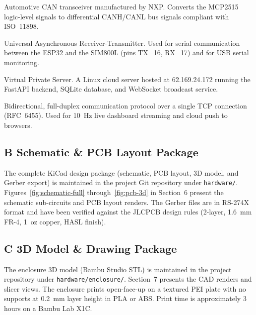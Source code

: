 \begin{description}[leftmargin=3.2cm, style=nextline, font=\bfseries]
  \item[TJA1051T]   Automotive CAN transceiver manufactured by NXP. Converts the MCP2515 logic-level signals to differential CANH/CANL bus signals compliant with ISO~11898.
  \item[UART]       Universal Asynchronous Receiver-Transmitter. Used for serial communication between the ESP32 and the SIM800L (pins TX=16, RX=17) and for USB serial monitoring.
  \item[VPS]        Virtual Private Server. A Linux cloud server hosted at 62.169.24.172 running the FastAPI backend, SQLite database, and WebSocket broadcast service.
  \item[WebSocket]  Bidirectional, full-duplex communication protocol over a single TCP connection (RFC~6455). Used for 10~Hz live dashboard streaming and cloud push to browsers.
\end{description}

\clearpage

\subsection*{B \quad Schematic \& PCB Layout Package}

The complete KiCad design package (schematic, PCB layout, 3D model, and Gerber export) is maintained in the project Git repository under \texttt{hardware/}. Figures~\ref{fig:schematic-full} through~\ref{fig:pcb-3d} in Section~6 present the schematic sub-circuits and PCB layout renders. The Gerber files are in RS-274X format and have been verified against the JLCPCB design rules (2-layer, 1.6~mm FR-4, 1~oz copper, HASL finish).

\clearpage

\subsection*{C \quad 3D Model \& Drawing Package}

The enclosure 3D model (Bambu Studio STL) is maintained in the project repository under \texttt{hardware/enclosure/}. Section~7 presents the CAD renders and slicer views. The enclosure prints open-face-up on a textured PEI plate with no supports at 0.2~mm layer height in PLA or ABS. Print time is approximately 3 hours on a Bambu Lab X1C.

